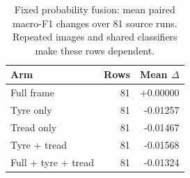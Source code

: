 \begin{table}[t]
\caption{Fixed probability fusion: mean paired macro-F1 changes over 81 source runs. Repeated images and shared classifiers make these rows dependent.}
\label{tab:fusion}
\centering
\small
\setlength{\tabcolsep}{4pt}
\begin{tabular}{lrr}
\toprule
Arm & Rows & Mean $\Delta$ \\
\midrule
Full frame & 81 & +0.00000 \\
Tyre only & 81 & -0.01257 \\
Tread only & 81 & -0.01467 \\
Tyre + tread & 81 & -0.01568 \\
Full + tyre + tread & 81 & -0.01324 \\
\bottomrule
\end{tabular}
\end{table}
